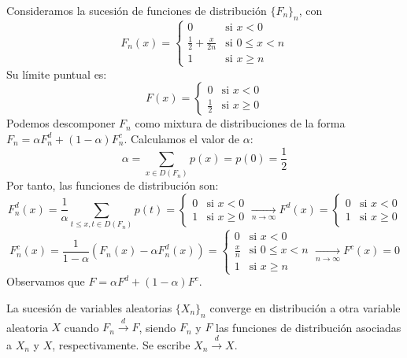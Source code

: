 \begin{example}
    Consideramos la sucesión de funciones de distribución $\{F_n\}_n$, con
    $$F_n(x) = \begin{cases}
            0                          & \text{si } x < 0        \\
            \frac{1}{2} + \frac{x}{2n} & \text{si } 0 \leq x < n \\
            1                          & \text{si } x \geq n
        \end{cases}$$
    Su límite puntual es:
    $$F(x) = \begin{cases}
            0           & \text{si } x < 0    \\
            \frac{1}{2} & \text{si } x \geq 0
        \end{cases}$$
    Podemos descomponer $F_n$ como mixtura de distribuciones de la forma $F_n = \alpha F_n^d + (1-\alpha)F_n^c$.
    Calculamos el valor de $\alpha$:
    $$\alpha = \sum_{x \in D(F_n)} p(x) = p(0) = \frac{1}{2}$$
    Por tanto, las funciones de distribución son:
    $$F_n^d(x) = \frac{1}{\alpha} \sum_{t \leq x, t \in D(F_n)} p(t) = \begin{cases}
            0 & \text{si } x < 0    \\
            1 & \text{si } x \geq 0
        \end{cases} \xrightarrow[n \to \infty]{}
        F^d(x) = \begin{cases}
            0 & \text{si } x < 0    \\
            1 & \text{si } x \geq 0
        \end{cases}$$
    $$F_n^c(x) = \frac{1}{1-\alpha}(F_n(x) - \alpha F_n^d(x)) = \begin{cases}
            0           & \text{si } x < 0        \\
            \frac{x}{n} & \text{si } 0 \leq x < n \\
            1           & \text{si } x \geq n
        \end{cases} \xrightarrow[n \to \infty]{}
        F^c(x) = 0$$
    Observamos que $F = \alpha F^d + (1-\alpha)F^c$.
\end{example}

\begin{definition}
    La sucesión de variables aleatorias $\{X_n\}_n$ converge en distribución a otra variable aleatoria $X$ cuando $F_n \xrightarrow{d} F$, siendo $F_n$ y $F$ las funciones de distribución asociadas a $X_n$ y $X$, respectivamente.
    Se escribe $X_n \xrightarrow{d} X$.
\end{definition}

